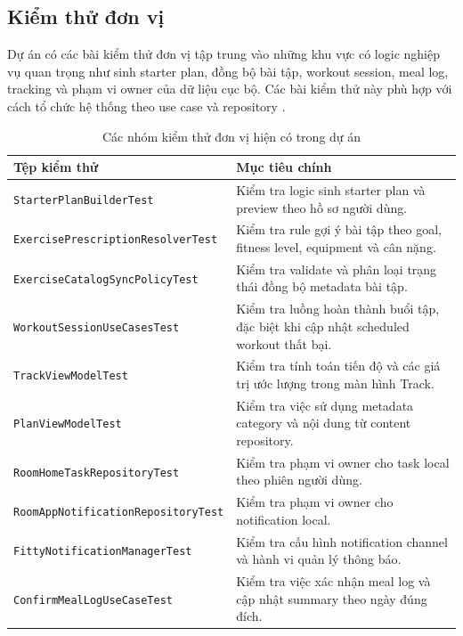 \subsection{Kiểm thử đơn vị}

Dự án có các bài kiểm thử đơn vị tập trung vào những khu vực có logic nghiệp vụ quan trọng như sinh starter plan, đồng bộ bài tập, workout session, meal log, tracking và phạm vi owner của dữ liệu cục bộ. Các bài kiểm thử này phù hợp với cách tổ chức hệ thống theo use case và repository \cite{android_jetpack,android_room}.

\begin{table}[H]
\centering
\small
\caption{Các nhóm kiểm thử đơn vị hiện có trong dự án}
\label{tab:unit-tests}
\begin{tabular}{|p{4.7cm}|p{7.4cm}|}
\hline
\textbf{Tệp kiểm thử} & \textbf{Mục tiêu chính} \\ \hline
\texttt{StarterPlanBuilderTest} & Kiểm tra logic sinh starter plan và preview theo hồ sơ người dùng. \\ \hline
\texttt{ExercisePrescriptionResolverTest} & Kiểm tra rule gợi ý bài tập theo goal, fitness level, equipment và cân nặng. \\ \hline
\texttt{ExerciseCatalogSyncPolicyTest} & Kiểm tra validate và phân loại trạng thái đồng bộ metadata bài tập. \\ \hline
\texttt{WorkoutSessionUseCasesTest} & Kiểm tra luồng hoàn thành buổi tập, đặc biệt khi cập nhật scheduled workout thất bại. \\ \hline
\texttt{TrackViewModelTest} & Kiểm tra tính toán tiến độ và các giá trị ước lượng trong màn hình Track. \\ \hline
\texttt{PlanViewModelTest} & Kiểm tra việc sử dụng metadata category và nội dung từ content repository. \\ \hline
\texttt{RoomHomeTaskRepositoryTest} & Kiểm tra phạm vi owner cho task local theo phiên người dùng. \\ \hline
\texttt{RoomAppNotificationRepositoryTest} & Kiểm tra phạm vi owner cho notification local. \\ \hline
\texttt{FittyNotificationManagerTest} & Kiểm tra cấu hình notification channel và hành vi quản lý thông báo. \\ \hline
\texttt{ConfirmMealLogUseCaseTest} & Kiểm tra việc xác nhận meal log và cập nhật summary theo ngày đúng đích. \\ \hline
\end{tabular}
\normalsize
\end{table}


